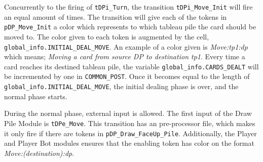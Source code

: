 \documentclass[runningheads,a4paper]{llncs}
\newcommand{\GPenSIM}{../GPenSIM}
\begin{document}
Concurrently to the firing of \verb!tDPi_Turn!, the transition \verb!tDPi_Move_Init! will fire an equal amount of times. The transition will give each of the tokens in \verb!pDP_Move_Init! a color which represents to which tableau pile the \ac{card} should be moved to. The color given to each token is augmented by the cell, \verb!global_info.INITIAL_DEAL_MOVE!. An example of a color given is \emph{Move:\ac{tp}1:\ac{dp}} which means; \textit{Moving a card from source DP to destination \ac{tp}1}. Every time a \ac{card} reaches its destined tableau pile, the variable \verb!global_info.CARDS_DEALT! will be incremented by one in \verb!COMMON_POST!. Once it becomes equal to the length of \verb!global_info.INITIAL_DEAL_MOVE!, the initial dealing phase is over, and the normal phase starts.
\newline

During the normal phase, external input is allowed. The first input of the Draw Pile Module is \verb!tDPe_Move!. This transition has an pre-processor file, which makes it only fire if there are tokens in \verb!pDP_Draw_FaceUp_Pile!. Additionally, the Player and Player Bot modules ensures that the enabling token has color on the format \textit{Move:(destination):\ac{dp}}.

\end{document}

